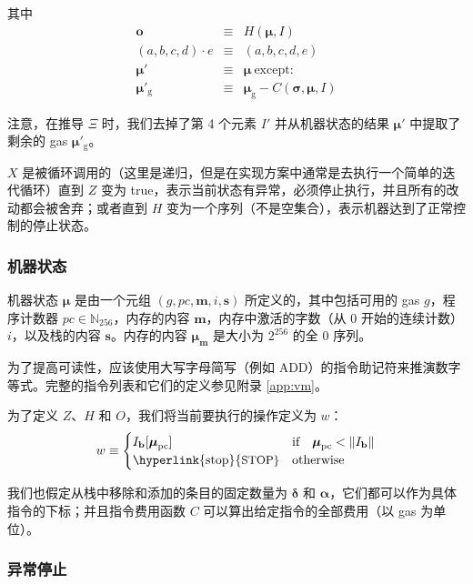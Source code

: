 \documentclass[9pt,oneside]{amsart}
\makeatletter
\newcommand{\linkdest}[1]{\Hy@raisedlink{\hypertarget{#1}{}}}
\makeatother
\begin{document}
\begin{multicols}{2}
其中
\begin{eqnarray}
\mathbf{o} & \equiv & H(\boldsymbol{\mu}, I) \\
(a, b, c, d) \cdot e & \equiv & (a, b, c, d, e) \\
\boldsymbol{\mu}' & \equiv & \boldsymbol{\mu}\ \text{except:} \\
\boldsymbol{\mu}'_{\mathrm{g}} & \equiv & \boldsymbol{\mu}_{\mathrm{g}} - C(\boldsymbol{\sigma}, \boldsymbol{\mu}, I)
\end{eqnarray}

注意，在推导 $\Xi$ 时，我们去掉了第 4 个元素 $I'$ 并从机器状态的结果 $\boldsymbol{\mu}'$ 中提取了剩余的 gas $\boldsymbol{\mu}'_{\mathrm{g}}$。

$X$ 是被循环调用的（这里是递归，但是在实现方案中通常是去执行一个简单的迭代循环）直到 \hyperlink{zhalt}{$Z$} 变为 true，表示当前状态有异常，必须停止执行，并且所有的改动都会被舍弃；或者直到 \hyperlink{hhalt}{$H$} 变为一个序列（不是空集合），表示机器达到了正常控制的停止状态。

\subsubsection{机器状态}
机器状态 $\boldsymbol{\mu}$ 是由一个元组 $(g, pc, \mathbf{m}, i, \mathbf{s})$ 所定义的，其中包括可用的 gas $g$，程序计数器 $pc \in \mathbb{N}_{256}$，内存的内容 $\mathbf{m}$，内存中激活的字数（从 0 开始的连续计数） $i$，以及栈的内容 $\mathbf{s}$。内存的内容 $\boldsymbol{\mu}_\mathbf{m}$ 是大小为 $2^{256}$ 的全 0 序列。

为了提高可读性，应该使用大写字母简写（例如 {\small ADD}）的指令助记符来推演数字等式。完整的指令列表和它们的定义参见附录 \ref{app:vm}。

为了定义 $Z$、$H$ 和 $O$，我们将当前要执行的操作定义为 $w$：
\begin{equation}\label{eq:currentoperation}
w \equiv \begin{cases} I_{\mathbf{b}}[\boldsymbol{\mu}_{\mathrm{pc}}] & \text{if} \quad \boldsymbol{\mu}_{\mathrm{pc}} < \lVert I_{\mathbf{b}} \rVert \\
\text{\hyperlink{stop}{\small STOP}} & \text{otherwise}
\end{cases}
\end{equation}

我们也假定从栈中移除和添加的条目的固定数量为 $\mathbf{\delta}$ 和 $\mathbf{\alpha}$，它们都可以作为具体指令的下标；并且指令费用函数 $C$ 可以算出给定指令的全部费用（以 gas 为单位）。

\subsubsection{异常停止}\hypertarget{Exceptional_Halting_function_Z}{}\linkdest{zhalt}


\end{multicols}
\end{document}
